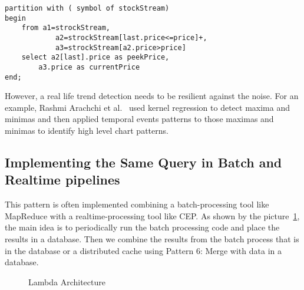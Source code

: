 \documentclass{sig-alternate}
\begin{document}
{\begin{lstlisting}[mathescape, showstringspaces=false]
partition with ( symbol of stockStream)
begin 
    from a1=strockStream, 
            a2=strockStream[last.price<=price]+,
            a3=strockStream[a2.price>price]
    select a2[last].price as peekPrice, 
    	a3.price as currentPrice
end;
\end{lstlisting} 

However, a real life trend detection needs to be resilient against the noise. For an example, Rashmi Arachchi et al.~\cite{chartPatterns} used kernel regression to detect maxima and minimas and then applied temporal events patterns to those maximas and minimas to identify high level chart patterns. 

\subsection{Implementing the Same Query in Batch and Realtime pipelines}

This pattern is often implemented combining a batch-processing tool like MapReduce with a realtime-processing tool like CEP. As shown by the picture~\ref{fig:q3}, the main idea is to periodically run the batch processing code and place the results in a database. Then we combine the results from the batch process that is in the database or a distributed cache using Pattern 6: Merge with data in a database. 

\begin{figure}[!htbp]
\centering
{}
\caption{Lambda Architecture}
\label{fig:q3}
\end{figure}






}
\end{document}
